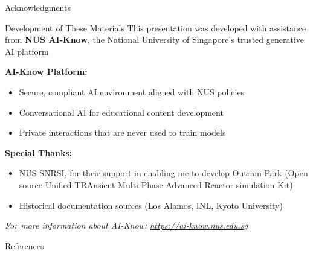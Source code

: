 \documentclass[aspectratio=169]{beamer}
\begin{document}
\begin{frame}[allowframebreaks]{Acknowledgments}
    \begin{block}{Development of These Materials}
        This presentation was developed with assistance from \textbf{NUS AI-Know}, 
        the National University of Singapore's trusted generative AI platform 
        \cite{aiknow2025prke}
    \end{block}

    \vspace{1em}
    \textbf{AI-Know Platform:}
    \begin{itemize}
        \item Secure, compliant AI environment aligned with NUS policies
        \item Conversational AI for educational content development
        \item Private interactions that are never used to train models
    \end{itemize}

    \vspace{1em}
    \textbf{Special Thanks:}
    \begin{itemize}
        \item NUS SNRSI, for their support in enabling me to develop 
            Outram Park (Open source Unified TRAnsient Multi Phase 
            Advanced Reactor simulation Kit)
        \item Historical documentation sources (Los Alamos, INL, Kyoto University)
    \end{itemize}

    \vspace{1em}
    \centering
    \small
    \textit{For more information about AI-Know: \href{https://ai-know.nus.edu.sg}{https://ai-know.nus.edu.sg}}
\end{frame}

\begin{frame}[allowframebreaks]{References}
    \printbibliography[heading=none]
\end{frame}
\end{document}
